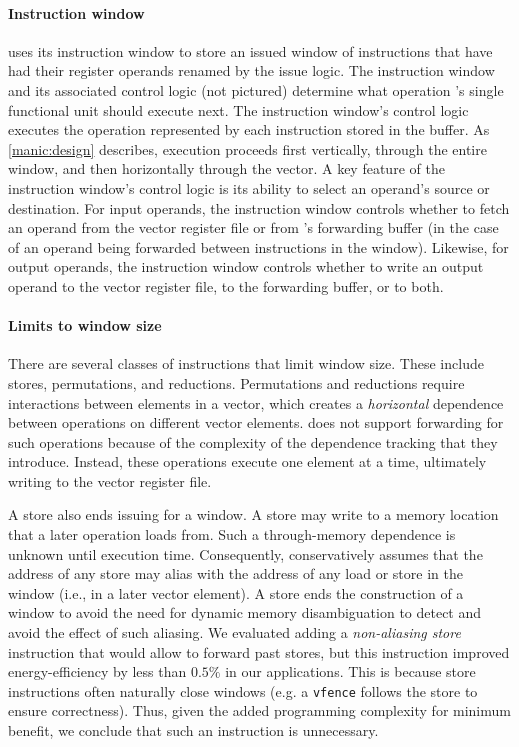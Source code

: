 \paragraph{Instruction window}
\manic uses its instruction window to store an issued window of
instructions that have had their register operands renamed by the issue logic.
%
The instruction window and its associated control logic (not pictured)
determine what operation \manic's single functional unit should execute next.
%
The instruction window's control logic executes the operation represented by each instruction stored in the 
buffer. 
%
As \autoref{manic:design} describes, execution proceeds first vertically,
through the entire window, and then horizontally through the vector.
%
A key feature of the instruction window's control logic is its ability to
select an operand's source or destination. 
%
For input operands, the instruction window controls whether to fetch an operand from the
vector register file or from \manic's forwarding buffer (in the case of an
operand being forwarded between instructions in the window).
%
Likewise, for output operands, the instruction window controls whether to write
an output operand to the vector register file, to the forwarding buffer, or to both.

\paragraph{Limits to window size}
There are several classes of instructions that limit window size.
%
These include stores, permutations, and reductions.
%
Permutations and reductions require interactions between elements in a vector, which
creates a {\em horizontal} dependence between operations on different vector elements.
%
\manic does not support forwarding for such operations because of the complexity of
the dependence tracking that they introduce.  
% 
Instead, these operations execute one element at a time, ultimately writing to the vector register file. 

A store also ends issuing for a window.  A store may write to a memory
location that a later operation loads from. Such a through-memory dependence is 
unknown until execution time.  Consequently, \manic conservatively assumes
that the address of any store may alias with the address of any load or store in the window (i.e., in a later vector element).
A store ends the construction of a window to avoid the need for dynamic memory disambiguation to
detect and avoid the effect of such aliasing.
% 
We evaluated adding a \emph{non-aliasing store} instruction that would allow \manic to forward past stores,
but this instruction improved energy-efficiency by less than $0.5\%$ in our applications.
% 
This is because store instructions often naturally close windows (e.g. a {\tt vfence} follows the store to ensure correctness).
% 
Thus, given the added programming complexity for minimum benefit, we conclude that such an instruction is unnecessary.
%


